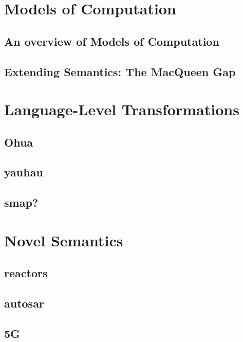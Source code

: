 \documentclass{report}
\begin{document}
\chapter{Models of Computation}

\section{An overview of Models of Computation}

\section{Extending Semantics: The MacQueen Gap} %

\chapter{Language-Level Transformations}
\section{Ohua}
 
\section{yauhau}
\section{smap?}



\chapter{Novel Semantics}

\section{reactors}
\section{autosar}
\section{5G}
\end{document}
